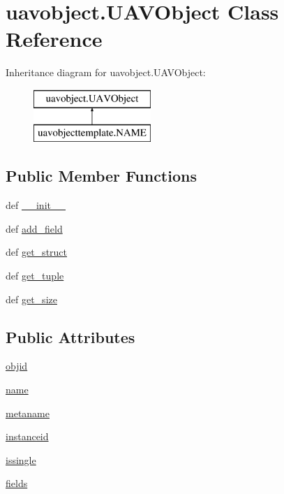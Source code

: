 \hypertarget{classuavobject_1_1_u_a_v_object}{\section{uavobject.\-U\-A\-V\-Object \-Class \-Reference}
\label{classuavobject_1_1_u_a_v_object}
}
\-Inheritance diagram for uavobject.\-U\-A\-V\-Object\-:\begin{figure}[H]
\begin{center}
\leavevmode
\includegraphics[height=2.000000cm]{classuavobject_1_1_u_a_v_object}
\end{center}
\end{figure}
\subsection*{\-Public \-Member \-Functions}
\begin{DoxyCompactItemize}
\item 
def \hyperlink{classuavobject_1_1_u_a_v_object_a6744d21db1b6b3009810ccc3699de1e9}{\-\_\-\-\_\-init\-\_\-\-\_\-}
\item 
def \hyperlink{classuavobject_1_1_u_a_v_object_ae767bb2ed6b584dce14d7dbb702730d5}{add\-\_\-field}
\item 
def \hyperlink{classuavobject_1_1_u_a_v_object_a3630e10e7bad50b6f2a03b22fd8616ba}{get\-\_\-struct}
\item 
def \hyperlink{classuavobject_1_1_u_a_v_object_a9419e3f1febc2de7b09a3b52028b8a36}{get\-\_\-tuple}
\item 
def \hyperlink{classuavobject_1_1_u_a_v_object_a52fe6009add2d12cfcf07f31a65b55c8}{get\-\_\-size}
\end{DoxyCompactItemize}
\subsection*{\-Public \-Attributes}
\begin{DoxyCompactItemize}
\item 
\hyperlink{classuavobject_1_1_u_a_v_object_a3b1453f9df2858ac082089867cc91667}{objid}
\item 
\hyperlink{classuavobject_1_1_u_a_v_object_a18e778e490804c6beb88c60b40e6cf70}{name}
\item 
\hyperlink{classuavobject_1_1_u_a_v_object_af6ccf832bcb7ad216b1b7e5461ceb39e}{metaname}
\item 
\hyperlink{classuavobject_1_1_u_a_v_object_a012fd4a0732970d3c5c010b073ad8f94}{instanceid}
\item 
\hyperlink{classuavobject_1_1_u_a_v_object_af380208f7a1b06c39870e351d7dfc803}{issingle}
\item 
\hyperlink{classuavobject_1_1_u_a_v_object_af9ce81de37f806ae8b2b50bfa9e6c72b}{fields}
\end{DoxyCompactItemize}


